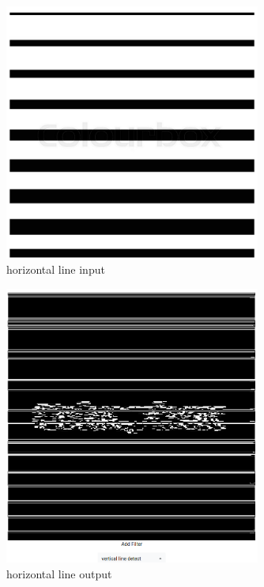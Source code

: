 \documentclass{article}
\begin{document}
  \begin{figure}[!htb]
    \centering
    \includegraphics[width=0.75\textwidth]{assets/horizontal_line.png}
    \caption{horizontal line input}
    \label{fig:horizontal-line}
  \end{figure}

  \begin{figure}[!htb]
    \centering
    \includegraphics[width=0.75\textwidth]{assets/horizontal_line_output.png}
    \caption{horizontal line output}
    \label{fig:horizontal-line-output}
  \end{figure}
\end{document}
